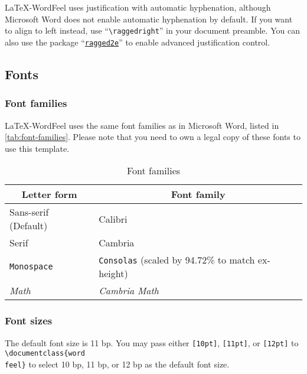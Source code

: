 \documentclass[letterpaper]{wordfeel}
\begin{document}
\LaTeX-WordFeel uses justification with automatic hyphenation, although Microsoft Word does not enable automatic hyphenation by default. If you want to align to left instead, use ``\texttt{\textbackslash{}raggedright}'' in your document preamble. You can also use the package ``\href{https://ctan.org/pkg/ragged2e}{\texttt{ragged2e}}'' to enable advanced justification control.

\subsection{Fonts}

\subsubsection{Font families}

\FloatBarrier

\LaTeX-WordFeel uses the same font families as in Microsoft Word, listed in \autoref{tab:font-families}. Please note that you need to own a legal copy of these fonts to use this template.

\begin{table}[htb]
    \centering
    \caption{Font families}
    \label{tab:font-families}
    \begin{tabular}{ll}
        \toprule
        \multicolumn{1}{c}{Letter form} & \multicolumn{1}{c}{Font family} \\
        \midrule
        \textsf{Sans-serif (Default)} & \textsf{Calibri} \\
        Serif & \textrm{Cambria} \\
        \texttt{Monospace} & \texttt{Consolas} (scaled by 94.72\% to match ex-height) \\
        \textrm{\textit{Math}} & \textrm{\textit{Cambria Math}} \\
        \bottomrule
    \end{tabular}
\end{table}

\FloatBarrier

\subsubsection{Font sizes}

The default font size is 11 bp. You may pass either \texttt{[10pt]}, \texttt{[11pt]}, or \texttt{[12pt]} to \texttt{\textbackslash{}documentclass\{word\\feel\}} to select 10 bp, 11 bp, or 12 bp as the default font size.
\end{document}
